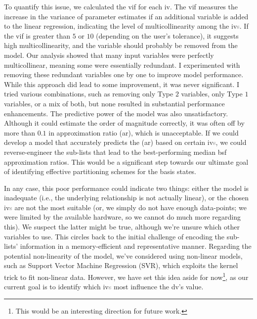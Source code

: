To quantify this issue, we calculated the \acrshort{vif} for each \acrshort{iv}. The \acrshort{vif} measures the increase in the variance of parameter estimates if an additional variable is added to the linear regression, indicating the level of multicollinearity among the \acrshort{iv}\textcolor{gray}{s}. If the \acrshort{vif} is greater than $5$ or $10$ (depending on the user's tolerance), it suggests high multicollinearity, and the variable should probably be removed from the model. Our analysis showed that many input variables were perfectly multicollinear, meaning some were essentially redundant. I experimented with removing these redundant variables one by one to improve model performance. While this approach did lead to some improvement, it was never significant. I tried various combinations, such as removing only Type $2$ variables, only Type $1$ variables, or a mix of both, but none resulted in substantial performance enhancements. The predictive power of the model was also unsatisfactory. Although it could estimate the order of magnitude correctly, it was often off by more than $0.1$ in approximation ratio (\acrshort{ar}), which is unacceptable. If we could develop a model that accurately predicts the (\acrshort{ar}) based on certain \acrshort{iv}\textcolor{gray}{s}, we could reverse-engineer the sub-lists that lead to the best-performing median \acrshort{bsf} approximation ratios. This would be a significant step towards our ultimate goal of identifying effective partitioning schemes for the basis states.

In any case, this poor performance could indicate two things: either the model is inadequate (i.e., the underlying relationship is not actually linear), or the chosen \acrshort{iv}\textcolor{gray}{s} are not the most suitable (or, we simply do not have enough data-points; we were limited by the available hardware, so we cannot do much more regarding this). We suspect the latter might be true, although we're unsure which other variables to use. This circles back to the initial challenge of encoding the sub-lists' information in a memory-efficient and representative manner. Regarding the potential non-linearity of the model, we've considered using non-linear models, such as Support Vector Machine Regression (SVR), which exploits the kernel trick to fit non-linear data. However, we have set this idea aside for now\footnote{This would be an interesting direction for future work.}, as our current goal is to identify which \acrshort{iv}\textcolor{gray}{s} most influence the \acrshort{dv}'s value.

